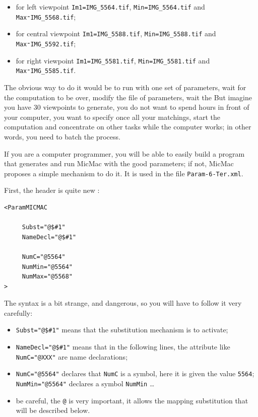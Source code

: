 \begin{itemize}
   \item  for left viewpoint {\tt Im1=IMG\_5564.tif}, {\tt Min=IMG\_5564.tif} and {\tt Max⁼IMG\_5568.tif};
   \item  for central viewpoint {\tt Im1=IMG\_5588.tif}, {\tt Min=IMG\_5588.tif} and {\tt Max⁼IMG\_5592.tif};
   \item  for right viewpoint {\tt Im1=IMG\_5581.tif}, {\tt Min=IMG\_5581.tif} and {\tt Max⁼IMG\_5585.tif}.
\end{itemize}


The obvious way to do it would be to run with one set of parameters, wait for the computation to be over, 
modify the file of parameters, wait the \UNCLEAR{\dots} %
But imagine you have $30$ viewpoints to generate,
you do not want to spend hours in front of your computer, you want to specify once all your
matchings, start the computation and concentrate on other tasks while the computer works;
in other words, you need to batch the process.

If you are a computer programmer, you will be able to
easily build a program that generates and run MicMac with the good parameters; if
not, MicMac proposes a simple mechanism to do it. It is used
in the file {\tt Param-6-Ter.xml}.

First, the header is quite new :

{\scriptsize
\begin{verbatim}
<ParamMICMAC

     Subst="@$#1"
     NameDecl="@$#1"

     NumC="@5564"
     NumMin="@5564"
     NumMax="@5568"
>
\end{verbatim}
}

The syntax is a bit strange, and dangerous, so you will have to follow it
very carefully:

\begin{itemize}
   \item  {\tt Subst="@\$\#1"}  means that the substitution mechanism is to activate;

   \item  {\tt  NameDecl="@\$\#1"}  means that in the following lines, the attribute
         like {\tt NumC="@XXX"} are name declarations;

   \item  {\tt  NumC="@5564"}  declares that {\tt NumC} is a symbol, here  it is given the
          value {\tt 5564};  {\tt NumMin="@5564"} declares a symbol {\tt NumMin} \dots

   \item  be careful, the {\tt @} is very important, it allows the mapping substitution 
          that will be described below.
\end{itemize}


